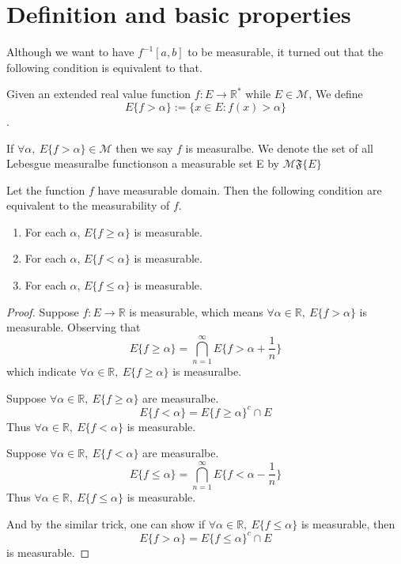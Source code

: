 \documentclass[lang=en, 12pt]{elegantbook}
\newcommand{\RR}{\mathbb{R}}
\newcommand{\lmf}[1]{$\mathcal{M} \mathfrak{F} \{#1\}$}
\begin{document}
        \section{Definition and basic properties}
            Although we want to have $f^{-1}[a,b]$ to be measurable, it turned out that the following condition is equivalent to that.
            \begin{definition}
                Given an extended real value function $f: E \to \mathbb{R}^*$ while $E\in \mathcal{M}$, We define $$E\{f>\alpha\}:=\{x\in E:f(x) > \alpha\}$$. \par
                If $\forall \alpha, \ E\{f>\alpha\} \in \mathcal{M}$ 
                then we say $f$ is measuralbe. We denote the set of all Lebesgue measuralbe functionson a measurable set E by \lmf{E}
            \end{definition}
            \begin{proposition}
                Let the function $f$ have measurable domain. Then the following condition are equivalent to the measurability of $f$.
                \begin{enumerate}
                    \item For each $\alpha$, $E\{f \geq \alpha\}$ is measurable.
                    \item For each $\alpha$, $E\{f < \alpha\}$ is measurable.
                    \item For each $\alpha$, $E\{f \leq \alpha\}$ is measurable.
                \end{enumerate}
            \end{proposition}
            \begin{proof}
                Suppose $f:E \to \RR$ is measurable, which means $\forall \alpha \in \RR, \ E\{f>\alpha\}$ is measurable. Observing that
            $$E\{f \geq \alpha\} = \bigcap_{n=1}^{\infty} E\{f > \alpha + \frac{1}{n}\}$$
            which indicate $\forall \alpha \in \RR, \ E\{f \geq \alpha\}$ is measuralbe.\par
                Suppose $\forall \alpha \in \RR, \ E\{f \geq \alpha\}$ are measuralbe. 
                $$E\{f < \alpha\} = E\{f \geq \alpha\}^c \cap E$$
            Thus $\forall \alpha \in \RR, \ E\{f < \alpha\}$ is measurable.\par
                Suppose $\forall \alpha \in \RR, \ E\{f < \alpha\}$ are measuralbe.
                $$E\{f \leq \alpha\} = \bigcap_{n=1}^{\infty} E\{f < \alpha - \frac{1}{n}\}$$
            Thus $\forall \alpha \in \RR, \ E\{f \leq \alpha\}$ is measurable.\par 
                And by the similar trick, one can show if $\forall \alpha \in \RR, \ E\{f\leq \alpha\}$ is measurable, then 
                $$E\{f > \alpha\} = E\{f \leq \alpha\}^c \cap E$$
            is measurable. 
            \end{proof}\par
\end{document}
